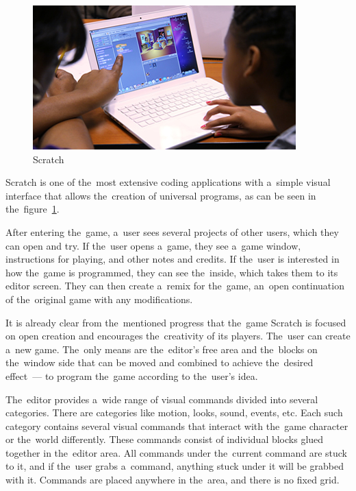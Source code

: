 \begin{figure}
    \centering
    \includegraphics[width=1\linewidth]{assets/similar-games/scratch.jpg}
    \caption{Scratch~\cite{a2022_scratch}}
    \label{fig:scratch}
\end{figure}

Scratch is one of the~most extensive coding applications with a~simple visual interface that allows the~creation of universal programs, as can be seen in the~figure~\ref{fig:scratch}.

After entering the~game, a~user sees several projects of other users, which they can open and try.
If the~user opens a~game, they see a~game window, instructions for playing, and other notes and credits.
If the~user is interested in how the~game is programmed, they can see the~inside, which takes them to its editor screen.
They can then create a~remix for the~game, an~open continuation of the~original game with any modifications.

It is already clear from the~mentioned progress that the~game Scratch is focused on open creation and encourages the~creativity of its players.
The~user can create a~new game.
The~only means are the~editor's free area and the~blocks on the~window side that can be moved and combined to achieve the~desired effect~--- to program the~game according to the~user's idea.

The~editor provides a~wide range of visual commands divided into several categories.
There are categories like motion, looks, sound, events, etc.
Each such category contains several visual commands that interact with the~game character or the~world differently.
These commands consist of individual blocks glued together in the~editor area.
All commands under the~current command are stuck to it, and if the~user grabs a~command, anything stuck under it will be grabbed with it.
Commands are placed anywhere in the~area, and there is no fixed grid.

